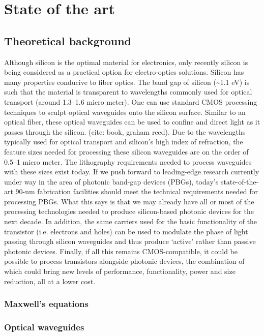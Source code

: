 \documentclass[../main.tex]{subfiles}
\begin{document}
	
	
\chapter{State of the art}

	\section{Theoretical background}
Although silicon is the optimal material for electronics, only recently silicon is being considered as a practical option for electro-optics solutions. Silicon has many properties conducive to fiber optics. The band gap of silicon (\textasciitilde1.1 eV) is such that the material is transparent to wavelengths commonly used for optical transport (around 1.3–1.6 micro meter). One can use standard CMOS processing techniques to sculpt optical waveguides onto the silicon surface. Similar to an optical fiber, these optical waveguides can be used to confine and direct light as it passes through the silicon. (cite: book, graham reed). Due to the wavelengths typically used for optical transport and silicon’s high index of refraction, the feature sizes needed for processing these silicon waveguides are on the order of 0.5–1 micro meter. The lithography requirements needed to process waveguides with these sizes exist today. If we push forward to leading-edge research currently under way in the area of photonic band-gap devices (PBGs), today’s state-of-the-art 90-nm fabrication facilities should meet the technical requirements needed for processing PBGs. What this says is that we may already have all or most of the processing technologies needed to produce silicon-based photonic devices for the next decade. In addition, the same carriers used for the basic functionality of the transistor (i.e. electrons and holes) can be used to modulate the phase of light passing through silicon waveguides and thus produce ‘active’ rather than passive photonic devices. Finally, if all this remains CMOS-compatible, it could be possible to process transistors alongside photonic devices, the combination of which could bring new levels of performance, functionality, power and size reduction, all at a lower cost.
		
		\subsection{Maxwell's equations}
	
		\subsection{Optical waveguides}
	
\end{document}
